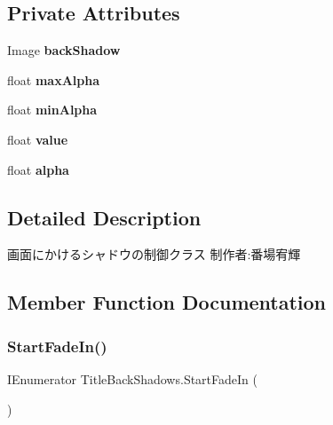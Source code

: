 \subsection*{Private Attributes}
\begin{DoxyCompactItemize}
\item 
\mbox{\label{class_title_back_shadows_a3a12486a8f50342e4f6b3099d4ba2cef}} 
Image {\bfseries back\+Shadow}
\item 
\mbox{\label{class_title_back_shadows_a38667ff999a8726e4eed9ce47088e098}} 
float {\bfseries max\+Alpha}
\item 
\mbox{\label{class_title_back_shadows_af8db6d7428190d751af70a12856d9082}} 
float {\bfseries min\+Alpha}
\item 
\mbox{\label{class_title_back_shadows_a82c67176795f0b0600f0ac8e4ebf88c2}} 
float {\bfseries value}
\item 
\mbox{\label{class_title_back_shadows_a06a8b0d11b452f6eee74e99515335e4d}} 
float {\bfseries alpha}
\end{DoxyCompactItemize}


\subsection{Detailed Description}
画面にかけるシャドウの制御クラス 制作者\+:番場宥輝 



\subsection{Member Function Documentation}
\mbox{\label{class_title_back_shadows_a88368f9e482c132413ff1c83614cea63}} 
\subsubsection{\texorpdfstring{Start\+Fade\+In()}{StartFadeIn()}}
{\footnotesize\ttfamily I\+Enumerator Title\+Back\+Shadows.\+Start\+Fade\+In (\begin{DoxyParamCaption}{ }\end{DoxyParamCaption})\hspace{0.3cm}{\ttfamily [inline]}}



